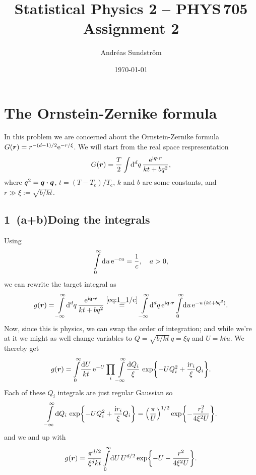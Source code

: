 \documentclass[11pt,letter, swedish, english
]{article}
\newcommand{\Tc}{\ensuremath{T_{\text{c}}}}
\begin{document}




\title{Statistical Physics 2 -- PHYS\,705 \\
Assignment 2}
\author{Andréas Sundström}
\date{\today}

\maketitle


\section{The Ornstein-Zernike formula}
In this problem we are concerned about the Ornstein-Zernike formula 
$G(\vb*r)=r^{-(d-1)/2}\mathrm{e}^{-r/\xi}$. We will start from the real space
respresentation 
\begin{equation}\label{eq:1_start}
G(\vb*r) = \frac{T}{2}\int\!\rd^dq\,\frac{\ee^{\ii\vb*q\vdot\vb*r}}{kt+bq^2},
\end{equation}
where $q^2=\vb*q\vdot\vb*q$, $t=(T-\Tc)/\Tc$, $k$ and $b$ are some
constants, and $r\gg\xi:=\sqrt{b/kt}$.

\subsection*{1~(a+b)\quad Doing the integrals}\addtocounter{subsection}{2}
Using 
\begin{equation}\label{eq:1_1/c}
\int_0^\infty\rd{u}\,\ee^{-cu}=\frac{1}{c}
\qcomma a>0,
\end{equation}
we can rewrite the target integral as
\begin{equation}
g(\vb*r)=\int_{-\infty}^\infty\!\rd^dq\,
\frac{\ee^{\ii\vb*q\vdot\vb*r}}{kt+bq^2}
\stackrel{\eqref{eq:1_1/c}}{=}
\int_{-\infty}^\infty\!\rd^dq\, \ee^{\ii\vb*q\vdot\vb*r}
\int_0^\infty\!\rd{u}\,\ee^{-u\,(kt+bq^2)}.
\end{equation}
Now, since this is physics\footnotemark{}, we can swap the order of
integration; and while we're at it we might as well change variables
to $Q=\sqrt{b/kt}\,q=\xi q$ and $U=ktu$. We thereby get
\begin{equation}
g(\vb*r)=\int_0^\infty\!\frac{\rd{U}}{kt}\,\ee^{-U}
\prod_i\int_{-\infty}^\infty\!\frac{\rd{Q}_i}{\xi}\,
 \exp{-UQ_i^2+\frac{\ii r_i}{\xi}Q_i}.
\end{equation}
Each of these $Q_i$ integrals are just regular Gaussian so
\begin{equation}
\int_{-\infty}^\infty\!\rd{Q}_i\,
 \exp{-UQ_i^2+\frac{\ii r_i}{\xi}Q_i}
=\qty(\frac{\pi}{U})^{1/2}\exp{-\frac{r_i^2}{4\xi^2U}}.
\end{equation}
and we and up with
\begin{equation}\label{eq:1b_end}
g(\vb*r)=\frac{\pi^{d/2}}{\xi^d kt}\int_0^\infty\!\rd{U}\,
U^{d/2}\exp{-U-\frac{r^2}{4\xi^2U}}.
\end{equation}
\end{document}
